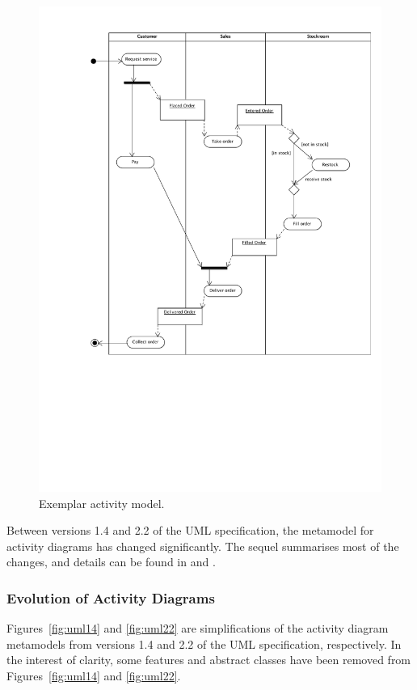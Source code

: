 \begin{figure}[htbp]
  \centering
  \includegraphics*[viewport=75 230 585 800,width=13cm]{6.Evaluation/images/activity.pdf}
  \caption{Exemplar activity model.}
  \label{fig:activity}
\end{figure}

Between versions 1.4 and 2.2 of the UML specification, the metamodel for activity diagrams has changed significantly. The sequel summarises most of the changes, and details can be found in \cite{uml14} and \cite{uml22}.

\subsubsection{Evolution of Activity Diagrams}
Figures~\ref{fig:uml14} and \ref{fig:uml22} are simplifications of the activity diagram metamodels from versions 1.4 and 2.2 of the UML specification, respectively. In the interest of clarity, some features and abstract classes have been removed from Figures~\ref{fig:uml14} and \ref{fig:uml22}.

